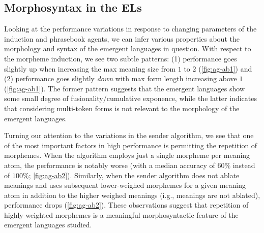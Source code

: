 
\subsection{Morphosyntax in the ELs}%
\label{sec:morphosyntax}
Looking at the performance variations in response to changing parameters of the induction and phrasebook agents, we can infer various properties about the morphology and syntax of the emergent languages in question.
With respect to the morpheme induction, we see two subtle patterns: (1) performance goes slightly up when increasing the max meaning size from $1$ to $2$ (\cref{fig:ag-ab1}) and (2) performance goes slightly \emph{down} with max form length increasing above $1$ (\cref{fig:ag-ab1}).
The former pattern suggests that the emergent languages show some small degree of fusionality/cumulative exponence, while the latter indicates that considering multi-token forms is not relevant to the morphology of the emergent languages.

Turning our attention to the variations in the sender algorithm, we see that one of the most important factors in high performance is permitting the repetition of morphemes.
When the algorithm employs just a single morpheme per meaning atom, the performance is notably worse (with a median accuracy of $60\%$ instead of $100\%$; \cref{fig:ag-ab2}).
Similarly, when the sender algorithm does not ablate meanings and uses subsequent lower-weighed morphemes for a given meaning atom in addition to the higher weighed meanings (i.g., meanings are not ablated), performance drops (\cref{fig:ag-ab2}).
These observations suggest that repetition of highly-weighted morphemes is a meaningful morphosyntactic feature of the emergent languages studied.

